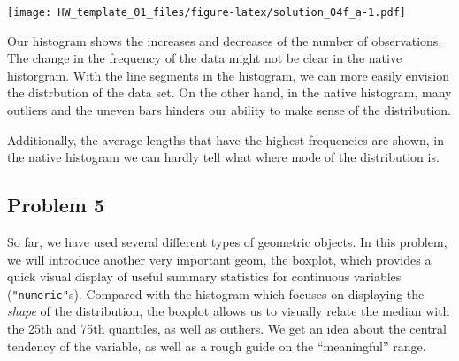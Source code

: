 \documentclass[]{article}
\newenvironment{Shaded}{\begin{snugshade}}{\end{snugshade}}
\newcommand{\DataTypeTok}[1]{\textcolor[rgb]{0.13,0.29,0.53}{#1}}
\newcommand{\DecValTok}[1]{\textcolor[rgb]{0.00,0.00,0.81}{#1}}
\newcommand{\FloatTok}[1]{\textcolor[rgb]{0.00,0.00,0.81}{#1}}
\newcommand{\KeywordTok}[1]{\textcolor[rgb]{0.13,0.29,0.53}{\textbf{#1}}}
\newcommand{\NormalTok}[1]{#1}
\newcommand{\OperatorTok}[1]{\textcolor[rgb]{0.81,0.36,0.00}{\textbf{#1}}}
\newcommand{\StringTok}[1]{\textcolor[rgb]{0.31,0.60,0.02}{#1}}
\begin{document}
\begin{Shaded}
\end{Shaded}

\texttt{[image: HW\_template\_01\_files/figure-latex/solution\_04f\_a-1.pdf]}

Our histogram shows the increases and decreases of the number of
observations. The change in the frequency of the data might not be clear
in the native historgram. With the line segments in the histogram, we
can more easily envision the distrbution of the data set. On the other
hand, in the native histogram, many outliers and the uneven bars hinders
our ability to make sense of the distribution.

Additionally, the average lengths that have the highest frequencies are
shown, in the native histogram we can hardly tell what where mode of the
distribution is.

\hypertarget{problem-5-1}{%
\subsection{Problem 5}\label{problem-5-1}}

So far, we have used several different types of geometric objects. In
this problem, we will introduce another very important geom, the
boxplot, which provides a quick visual display of useful summary
statistics for continuous variables (\texttt{"numeric"}s). Compared with
the histogram which focuses on displaying the \emph{shape} of the
distribution, the boxplot allows us to visually relate the median with
the 25th and 75th quantiles, as well as outliers. We get an idea about
the central tendency of the variable, as well as a rough guide on the
``meaningful'' range.
\end{document}
